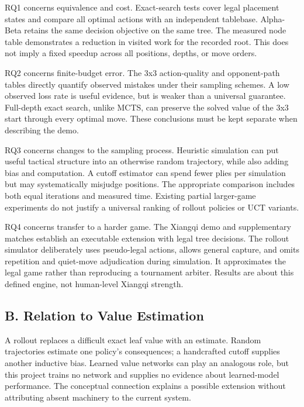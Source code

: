 \documentclass[conference]{IEEEtran}
\begin{document}
RQ1 concerns equivalence and cost. Exact-search tests cover legal placement states and compare all optimal actions with an independent tablebase. Alpha-Beta retains the same decision objective on the same tree. The measured node table demonstrates a reduction in visited work for the recorded root. This does not imply a fixed speedup across all positions, depths, or move orders.


RQ2 concerns finite-budget error. The 3x3 action-quality and opponent-path tables directly quantify observed mistakes under their sampling schemes. A low observed loss rate is useful evidence, but is weaker than a universal guarantee. Full-depth exact search, unlike MCTS, can preserve the solved value of the 3x3 start through every optimal move. These conclusions must be kept separate when describing the demo.


RQ3 concerns changes to the sampling process. Heuristic simulation can put useful tactical structure into an otherwise random trajectory, while also adding bias and computation. A cutoff estimator can spend fewer plies per simulation but may systematically misjudge positions. The appropriate comparison includes both equal iterations and measured time. Existing partial larger-game experiments do not justify a universal ranking of rollout policies or UCT variants.


RQ4 concerns transfer to a harder game. The Xiangqi demo and supplementary matches establish an executable extension with legal tree decisions. The rollout simulator deliberately uses pseudo-legal actions, allows general capture, and omits repetition and quiet-move adjudication during simulation. It approximates the legal game rather than reproducing a tournament arbiter. Results are about this defined engine, not human-level Xiangqi strength.


\subsection{B. Relation to Value Estimation}

A rollout replaces a difficult exact leaf value with an estimate. Random trajectories estimate one policy's consequences; a handcrafted cutoff supplies another inductive bias. Learned value networks can play an analogous role, but this project trains no network and supplies no evidence about learned-model performance. The conceptual connection explains a possible extension without attributing absent machinery to the current system.
\end{document}
